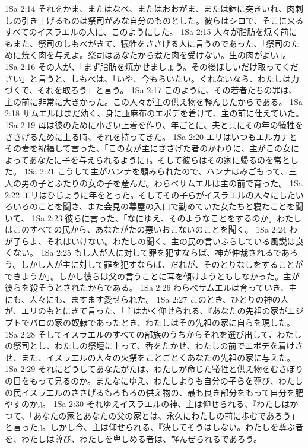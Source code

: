 1Sa 2:14  それをかま、またはなべ、またはおおがま、または鉢に突きいれ、肉刺しの引き上げるものは祭司がみな自分のものとした。彼らはシロで、そこに来るすべてのイスラエルの人に、このようにした。
1Sa 2:15  人々が脂肪を焼く前にもまた、祭司のしもべがきて、犠牲をささげる人に言うのであった、「祭司のために焼く肉を与えよ。祭司はあなたから煮た肉を受けない。生の肉がよい」。
1Sa 2:16  その人が、「まず脂肪を焼かせましょう。その後ほしいだけ取ってください」と言うと、しもべは、「いや、今もらいたい。くれないなら、わたしは力づくで、それを取ろう」と言う。
1Sa 2:17  このように、その若者たちの罪は、主の前に非常に大きかった。この人々が主の供え物を軽んじたからである。
1Sa 2:18  サムエルはまだ幼く、身に亜麻布のエポデを着けて、主の前に仕えていた。
1Sa 2:19  母は彼のために小さい上着を作り、年ごとに、夫と共にその年の犠牲をささげるために上る時、それを持ってきた。
1Sa 2:20  エリはいつもエルカナとその妻を祝福して言った、「この女が主にささげた者のかわりに、主がこの女によってあなたに子を与えられるように」。そして彼らはその家に帰るのを常とした。
1Sa 2:21  こうして主がハンナを顧みられたので、ハンナはみごもって、三人の男の子とふたりの女の子を産んだ。わらべサムエルは主の前で育った。
1Sa 2:22  エリはひじょうに年をとった。そしてその子らがイスラエルの人々にしたいろいろのことを聞き、また会見の幕屋の入口で勤めていた女たちと寝たことを聞いて、
1Sa 2:23  彼らに言った、「なにゆえ、そのようなことをするのか。わたしはこのすべての民から、あなたがたの悪いおこないのことを聞く。
1Sa 2:24  わが子らよ、それはいけない。わたしの聞く、主の民の言いふらしている風説は良くない。
1Sa 2:25  もし人が人に対して罪を犯すならば、神が仲裁されるであろう。しかし人が主に対して罪を犯すならば、だれが、そのとりなしをすることができようか」。しかし彼らは父の言うことに耳を傾けようともしなかった。主が彼らを殺そうとされたからである。
1Sa 2:26  わらべサムエルは育っていき、主にも、人々にも、ますます愛せられた。
1Sa 2:27  このとき、ひとりの神の人が、エリのもとにきて言った、「主はかく仰せられる、『あなたの先祖の家がエジプトでパロの家の奴隷であったとき、わたしはその先祖の家に自らを現した。
1Sa 2:28  そしてイスラエルのすべての部族のうちからそれを選び出して、わたしの祭司とし、わたしの祭壇に上って、香をたかせ、わたしの前でエポデを着けさせ、また、イスラエルの人々の火祭をことごとくあなたの先祖の家に与えた。
1Sa 2:29  それにどうしてあなたがたは、わたしが命じた犠牲と供え物をむさぼりの目をもって見るのか。またなにゆえ、わたしよりも自分の子らを尊び、わたしの民イスラエルのささげるもろもろの供え物の、最も良き部分をもって自分を肥やすのか』。
1Sa 2:30  それゆえイスラエルの神、主は仰せられる、『わたしはかつて、「あなたの家とあなたの父の家とは、永久にわたしの前に歩むであろう」と言った』。しかし今、主は仰せられる、『決してそうはしない。わたしを尊ぶ者を、わたしは尊び、わたしを卑しめる者は、軽んぜられるであろう。
